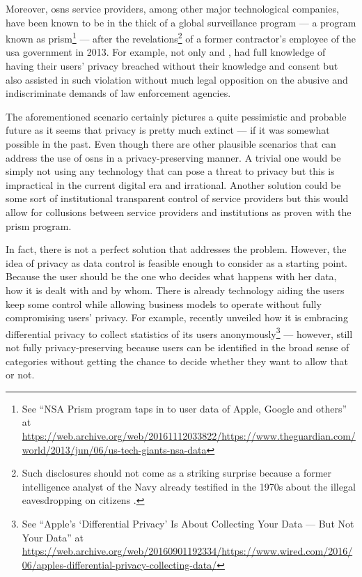 Moreover, \acp{osn} service providers, among other major technological companies, 
have been known to be in the thick of a global surveillance program --- a program 
known as \Ac{prism}\footnote{See ``NSA Prism program taps in to user data of Apple, Google and others'' at \url{https://web.archive.org/web/20161112033822/https://www.theguardian.com/world/2013/jun/06/us-tech-giants-nsa-data}} --- 
after the revelations\footnote{Such disclosures should not come as a striking surprise 
because a former intelligence analyst of the  Navy already testified in 
the 1970s about the illegal eavesdropping on  citizens \cite{Bamford14}.} 
of a former contractor's employee of the \ac{usa} government in 2013. For example, 
not only \Facebook and \Google, had full knowledge of having their users' privacy 
breached without their knowledge and consent but also assisted in such violation 
without much legal opposition on the abusive and indiscriminate demands of law enforcement 
agencies.

The aforementioned scenario certainly pictures a quite pessimistic and probable 
future as it seems that privacy is pretty much extinct --- if it was somewhat possible 
in the past. Even though there are other plausible scenarios that can address the 
use of \acp{osn} in a privacy-preserving manner. A trivial one would be simply not 
using any technology that can pose a threat to privacy but this is impractical in 
the current digital era and irrational. Another solution could be some sort of institutional 
transparent control of service providers but this would allow for collusions between 
service providers and institutions as proven with the \ac{prism} program.

In fact, there is not a perfect solution that addresses the problem. However, the 
idea of privacy as data control is feasible enough to consider as a starting point. 
Because the user should be the one who decides what happens with her data, how it 
is dealt with and by whom. There is already technology aiding the users keep some 
control while allowing business models to operate without fully compromising users' 
privacy. For example, \Apple recently unveiled how it is embracing differential 
privacy to collect statistics of its users anonymously\footnote{See ``Apple's `Differential Privacy' Is About Collecting Your Data --- But Not Your Data'' at \url{https://web.archive.org/web/20160901192334/https://www.wired.com/2016/06/apples-differential-privacy-collecting-data/}} 
--- however, still not fully privacy-preserving because users can be identified 
in the broad sense of categories without getting the chance to decide whether they 
want to allow that or not. 

